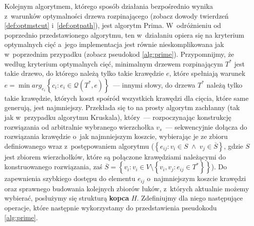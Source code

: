 Kolejnym algorytmem, którego sposób działania bezpośrednio wynika z~warunków optymalności drzewa rozpinającego (zobacz dowody twierdzeń \ref{def:optmstcut} i~\ref{def:optpath}), jest algorytm Prima.
W~odróżnieniu od poprzednio przedstawionego algorytmu, ten w~działaniu opiera się na kryterium optymalnych cięć a~jego implementacja jest równie nieskomplikowana jak w~poprzednim przypadku (zobacz pseudokod \ref{alg:prime}).
Przypomnijmy, że według kryterium optymalnych cięć, minimalnym drzewem rozpinającym $T^{\ast}$ jest takie drzewo, do którego należą tylko takie krawędzie $e$, które spełniają warunek $e = \min arg_{e_{i}} \left\{ c_{i} : e_{i} \in \mathcal{Q} \left( T^{\ast}, e \right) \right\}$~--- innymi słowy, do drzewa $T^{\ast}$ należą tylko takie krawędzie, których koszt spośród wszystkich krawędzi dla cięcia, które same generują, jest najmniejszy.
Przekłada się to na prosty algorytm zachłanny (tak jak w~przypadku algorytmu Kruskala), który~--- rozpoczynając konstrukcję rozwiązania od arbitralnie wybranego wierzchołka $v_{s}$~--- sekwencyjnie dołącza do rozwiązania krawędzie o~jak najmniejszym koszcie, wybierając je ze zbioru definiowanego wraz z~postępowaniem algorytmu ($\left\{ e_{ij} : v_{i} \in S \; \wedge \; v_{j} \in \overline{S} \right\}$, gdzie $S$ jest zbiorem wierzchołków, które są połączone krawędziami należącymi do konstruowanego rozwiązania, zaś $\overline{S} = \left\{ v_{i} : v_{i} \in V \setminus \left\{ v_{i}, v_{j} : e_{ij} \in T^{\ast} \right\} \right\}$).
Do zapewnienia szybkiego dostępu do elementu $e_{ij}$ o~najmniejszym koszcie krawędzi oraz sprawnego budowania kolejnych zbiorów łuków, z~których aktualnie możemy wybierać, posłużymy się strukturą \textbf{kopca} $H$.
Zdefiniujmy dla niego następujące operacje, które następnie wykorzystamy do przedstawienia pseudokodu \ref{alg:prime}.

